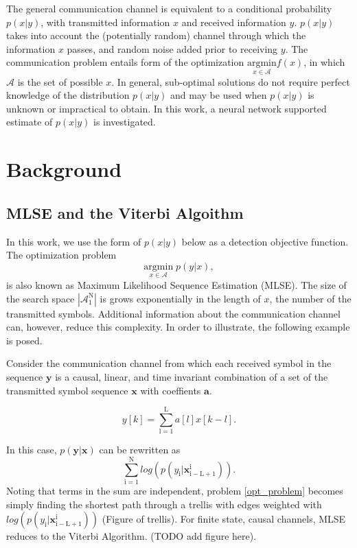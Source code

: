 \documentclass[12pt,a4paper]{report}
\begin{document}
The general communication channel is equivalent to a conditional probability $p(x|y)$, with transmitted information $x$ and received information $y$.  $p(x|y)$ takes into account the (potentially random) channel through which the information $x$ passes, and random noise added prior to receiving $y$. The communication problem entails form of the optimization $\underset{x\in\mathcal{A}}{\text{argmin}} f(x)$, in which $\mathcal{A}$ is the set of possible $x$. In general, sub-optimal solutions do not require perfect knowledge of the distribution $p(x|y)$ and may be used when $p(x|y)$ is unknown or impractical to obtain. In this work, a neural network supported estimate of $p(x|y)$ is investigated.

\section{Background}

\subsection{MLSE and the Viterbi Algoithm}
In this work, we use the form of $p(x|y)$  below as a detection objective function. The optimization problem
\begin{equation}\label{opt_problem}
\underset{x \in \textit{$\mathcal{A}$}}{\text{argmin}} \; p(y|x),
\end{equation}
 is also known as Maximum Likelihood Sequence Estimation (MLSE).
The size of the search space $|\mathcal{A}_{\mathrm{1}}^{\mathrm{N}}|$ is grows exponentially in the length of $x$, the number of the transmitted symbols. Additional information about the communication channel can, however, reduce this complexity. In order to illustrate, the following example is posed.
\par
Consider the communication channel from which each received symbol in the sequence $\mathbf{y}$ is a causal, linear, and time invariant combination of a set of the transmitted symbol sequence $\mathbf{x}$ with coeffients $\mathbf{a}$. 

\begin{equation}
y[k] = \sum_{\mathrm{l=1}}^{\mathrm{L}} a[l]x[k-l].
\end{equation}

In this case, $p(\mathbf{y}|\mathbf{x})$ can be rewritten as 
\begin{equation}
\sum_{\mathrm{i=1}}^{\mathrm{N}}log(p(y_{\mathrm{i}}|\mathbf{x}_{\mathrm{i-L+1}}^{\mathrm{i}}) ).
\end{equation}
Noting that terms in the sum are independent, problem \eqref{opt_problem} becomes simply finding the shortest path through a trellis with edges weighted with  $log(p(y_{\mathrm{i}}|\mathbf{x}_{\mathrm{i-L+1}}^{\mathrm{i}}) )$ (Figure of trellis).
For finite state, causal channels, MLSE reduces to the Viterbi Algorithm.  (TODO add figure here). 
\\
\end{document}
